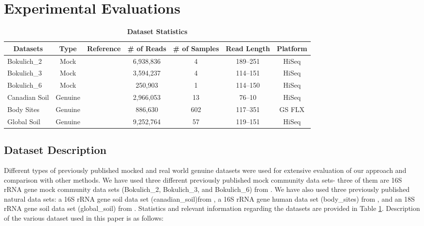 \documentclass[10pt, conference, compsocconf]{IEEEtran}
\begin{document}
\section{Experimental Evaluations}
\begin{table}[tb] 
\centering 
\caption{\textbf{Dataset Statistics}} \label{table:finaltabledataset} 
\begin{tabular}{|l| c c c c c c|} 
\hline
\multicolumn{1}{|c|}{{\bf{Datasets}}} & \multicolumn{1}{c}{{\bf{Type}}} & {\bf{Reference}} & {\bf{\# of Reads}} & {\bf{\# of Samples}} & {\bf{Read Length}} & {\bf{Platform}}\\
\hline
{Bokulich\_2} & Mock & \cite{MARmockDatasetRef} & 6,938,836 & 4 & 189--251 & HiSeq\\
{Bokulich\_3} & Mock & \cite{MARmockDatasetRef} & 3,594,237 & 4 & 114--151 & HiSeq\\
{Bokulich\_6} & Mock & \cite{MARmockDatasetRef} & 250,903 & 1 & 114--150 & HiSeq\\
{Canadian Soil} & Genuine & \cite{MARcanadianSoil} & 2,966,053 & 13 & 76--10 & HiSeq\\
{Body Sites} & Genuine & \cite{MARbodySites} & 886,630 & 602 & 117--351 & GS FLX\\
{Global Soil} & Genuine & \cite{MARglobalSoil} & 9,252,764 & 57 & 119--151 & HiSeq\\
\hline
\end{tabular}
\end{table} 

\subsection{Dataset Description}
Different types of previously published mocked and real world genuine datasets were used for extensive evaluation of our approach and comparison with other methods. We have used three different previously published mock community data sets- three of them are 16S rRNA gene mock community data sets (Bokulich\_2, Bokulich\_3, and Bokulich\_6) from \cite{MARmockDatasetRef}. We have also used three previously published natural data sets: a 16S rRNA gene soil data set (canadian\_soil)from \cite{MARcanadianSoil}, a 16S rRNA gene human data set (body\_sites) from \cite{MARbodySites}, and an 18S rRNA gene soil data set (global\_soil) from \cite{MARglobalSoil}. Statistics and relevant information regarding the datasets are provided in Table \ref{table:finaltabledataset}. Description of the various dataset used in this paper is as follows:\\
\end{document}
